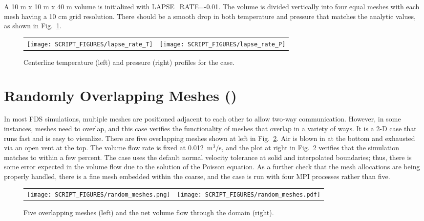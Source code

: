 \documentclass[11pt]{book}
\begin{document}
A 10 m x 10 m x 40 m volume is initialized with {\ct LAPSE\_RATE=-0.01}.  The volume is divided vertically into four equal meshes with each mesh having a 10 cm grid resolution.  There should be a smooth drop in both temperature and pressure that matches the analytic values, as shown in Fig.~\ref{lapse_rate_fig}.

\begin{figure}[!ht]
\begin{tabular*}{\textwidth}{lr}
\texttt{[image: SCRIPT\_FIGURES/lapse\_rate\_T]} &
\texttt{[image: SCRIPT\_FIGURES/lapse\_rate\_P]}
\end{tabular*}
\caption[The  test case]{Centerline temperature (left) and pressure (right) profiles for the  case.}
\label{lapse_rate_fig}
\end{figure}


\section{Randomly Overlapping Meshes (\texorpdfstring{}{random\_meshes})}
\label{random_meshes}

In most FDS simulations, multiple meshes are positioned adjacent to each other to allow two-way communication. However, in some instances, meshes need to overlap, and this case verifies the functionality of meshes that overlap in a variety of ways. It is a 2-D case that runs fast and is easy to visualize. There are five overlapping meshes shown at left in Fig.~\ref{random_meshes_fig}. Air is blown in at the bottom and exhausted via an open vent at the top. The volume flow rate is fixed at 0.012~m$^3$/s, and the plot at right in Fig.~\ref{random_meshes_fig} verifies that the simulation matches to within a few percent. The case uses the default normal velocity tolerance at solid and interpolated boundaries; thus, there is some error expected in the volume flow due to the solution of the Poisson equation. As a further check that the mesh allocations are being properly handled, there is a fine mesh embedded within the coarse, and the case is run with four MPI processes rather than five.

\begin{figure}[!ht]
\begin{tabular*}{\textwidth}{lr}
\texttt{[image: SCRIPT\_FIGURES/random\_meshes.png]} &
\texttt{[image: SCRIPT\_FIGURES/random\_meshes.pdf]}
\end{tabular*}
\caption[The  test case]{Five overlapping meshes (left) and the net volume flow through the domain (right).}
\label{random_meshes_fig}
\end{figure}
\end{document}
